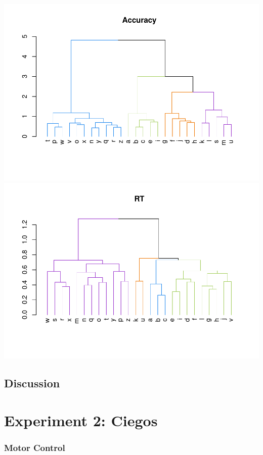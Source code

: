 \documentclass[english,man]{apa7}
\begin{document}
\includegraphics{BF_ms_1_files/figure-latex/Dendrograms with color sighted -1.pdf} \includegraphics{BF_ms_1_files/figure-latex/Dendrograms with color sighted -2.pdf}

\hypertarget{discussion}{%
\subsection{Discussion}\label{discussion}}

\hypertarget{experiment-2-ciegos}{%
\section{Experiment 2: Ciegos}\label{experiment-2-ciegos}}

\hypertarget{motor-control}{%
\subsubsection{Motor Control}\label{motor-control}}
\end{document}
